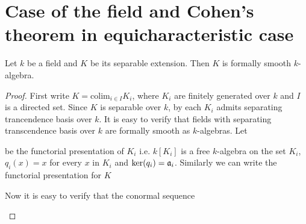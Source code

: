 \section{Case of the field and Cohen's theorem in equicharacteristic case}

\begin{proposition}\label{proposition:separable_field_extensions_are_formally_smooth}
Let $k$ be a field and $K$ be its separable extension. Then $K$ is formally smooth $k$-algebra.
\end{proposition}
\begin{proof}
First write $K = \mathrm{colim}_{i\in I}K_i$, where $K_i$ are finitely generated over $k$ and $I$ is a directed set. Since $K$ is separable over $k$, by {\cite[Theorem 4.3]{Topics_in_fields}} each $K_i$ admits separating trancendence basis over $k$. It is easy to verify that fields with separating transcendence basis over $k$ are formally smooth as $k$-algebras. Let
\begin{center}
\end{center}
be the functorial presentation of $K_i$ i.e. $k[K_i]$ is a free $k$-algebra on the set $K_i$, $q_i(x)=x$ for every $x$ in $K_i$ and $\Ker(q_i)=\ideal{a}_i$. Similarly we can write the functorial presentation for $K$
\begin{center}
\end{center}
Now it is easy to verify that the conormal sequence
\begin{center}
\begin{tikzpicture}

\end{tikzpicture}
\end{center}
\end{proof}
